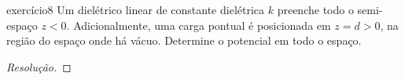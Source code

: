\begin{exercício}{}{exercício8}
    Um dielétrico linear de constante dielétrica \(k\) preenche todo o semi-espaço \(z < 0\). Adicionalmente, uma carga pontual é posicionada em \(z = d > 0\), na região do espaço onde há vácuo. Determine o potencial em todo o espaço.
\end{exercício}
\begin{proof}[Resolução]

\end{proof}
